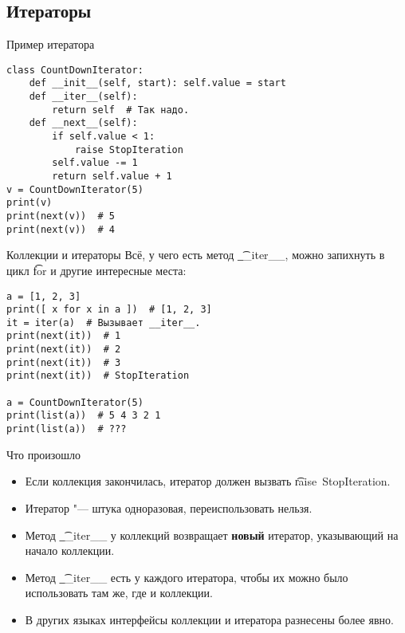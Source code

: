 \subsection{Итераторы}
\begin{frame}
\end{frame}

\begin{frame}[fragile]{Пример итератора}
\begin{verbatim}
class CountDownIterator:
    def __init__(self, start): self.value = start
    def __iter__(self):
        return self  # Так надо.
    def __next__(self):
        if self.value < 1:
            raise StopIteration
        self.value -= 1
        return self.value + 1
v = CountDownIterator(5)
print(v)
print(next(v))  # 5
print(next(v))  # 4
\end{verbatim}
\end{frame}

\begin{frame}[fragile]{Коллекции и итераторы}
	Всё, у чего есть метод \t{\_\_iter\_\_}, можно запихнуть в цикл \t{for} и другие интересные места:
\begin{verbatim}
a = [1, 2, 3]
print([ x for x in a ])  # [1, 2, 3]
it = iter(a)  # Вызывает __iter__.
print(next(it))  # 1
print(next(it))  # 2
print(next(it))  # 3
print(next(it))  # StopIteration

a = CountDownIterator(5)
print(list(a))  # 5 4 3 2 1
print(list(a))  # ???
\end{verbatim}
\end{frame}

\begin{frame}{Что произошло}
	\begin{itemize}
		\item Если коллекция закончилась, итератор должен вызвать \t{raise~StopIteration}.
		\item Итератор "--- штука одноразовая, переиспользовать нельзя.
		\item Метод \t{\_\_iter\_\_} у коллекций возвращает \textbf{новый} итератор, указывающий на начало коллекции.
		\item Метод \t{\_\_iter\_\_} есть у каждого итератора, чтобы их можно было использовать там же, где и коллекции.
		\item В других языках интерфейсы коллекции и итератора разнесены более явно.
	\end{itemize}
\end{frame}

